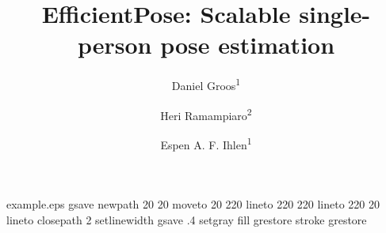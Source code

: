 \begin{filecontents*}{example.eps}
gsave
newpath
  20 20 moveto
  20 220 lineto
  220 220 lineto
  220 20 lineto
closepath
2 setlinewidth
gsave
  .4 setgray fill
grestore
stroke
grestore
\end{filecontents*}
\RequirePackage{fix-cm}
\documentclass[twocolumn]{svjour3}          \smartqed  

\usepackage{graphicx}
\usepackage{cite}
\usepackage{authblk}
\usepackage{tikz}
\usepackage{amsfonts}
\usepackage{hhline}
\usepackage{amsmath}
\usepackage{mathtools}
\usepackage{url}
\def\checkmark{\tikz\fill[scale=0.4](0,.35) -- (.25,0) -- (1,.7) -- (.25,.15) -- cycle;} 
\DeclarePairedDelimiter\ceil{\lceil}{\rceil}
\DeclarePairedDelimiter\floor{\lfloor}{\rfloor}
\newcommand{\norm}[1]{\| #1 \|}



\title{EfficientPose: Scalable single-person pose estimation}

\author{Daniel Groos\textsuperscript{1} \and Heri Ramampiaro\textsuperscript{2} \and Espen A. F. Ihlen\textsuperscript{1}}




